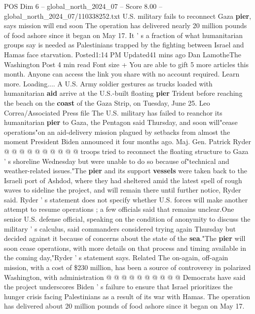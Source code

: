 \begin{textsample}{POS Dim 6 – global\_north\_2024\_07 – Score 8.00 – global\_north\_2024\_07/110338252.txt}  \label{ex:f6_pos_303}
U.S. military fails to reconnect Gaza \textbf{pier}, says mission will end soon The operation has delivered nearly 20 million pounds of food ashore since it began on May 17.
It ' s a fraction of what humanitarian groups say is needed as Palestinians trapped by the fighting between Israel and Hamas face starvation.
Posted1:14 PM Updated41 mins ago Dan LamotheThe Washington Post 4 min read Font size + You are able to gift 5 more articles this month.
Anyone can access the link you share with no account required.
Learn more.
Loading....
A U.S.
Army soldier gestures as trucks loaded with humanitarian \textbf{aid} arrive at the U.S.-built floating \textbf{pier} Trident before reaching the beach on the \textbf{coast} of the Gaza Strip, on Tuesday, June 25.
Leo Correa/Associated Press file The U.S. military has failed to reanchor its humanitarian \textbf{pier} to Gaza, the Pentagon said Thursday, and soon will"cease operations"on an aid-delivery mission plagued by setbacks from almost the moment President Biden announced it four months ago.
Maj.
Gen.
Patrick Ryder @ @ @ @ @ @ @ @ @ @ troops tried to reconnect the floating structure to Gaza ' s shoreline Wednesday but were unable to do so because of"technical and weather-related issues."The \textbf{pier} and its support \textbf{vessels} were taken back to the Israeli port of Ashdod, where they had sheltered amid the latest spell of rough waves to sideline the project, and will remain there until further notice, Ryder said.
Ryder ' s statement does not specify whether U.S. forces will make another attempt to resume operations ; a few officials said that remains unclear.One senior U.S. defense official, speaking on the condition of anonymity to discuss the military ' s calculus, said commanders considered trying again Thursday but decided against it because of concerns about the state of the \textbf{sea}."The \textbf{pier} will soon cease operations, with more details on that process and timing available in the coming day,"Ryder ' s statement says.
Related The on-again, off-again mission, with a cost of \$230 million, has been a source of controversy in polarized Washington, with administration @ @ @ @ @ @ @ @ @ @ Democrats have said the project underscores Biden ' s failure to ensure that Israel prioritizes the hunger crisis facing Palestinians as a result of its war with Hamas.
The operation has delivered about 20 million pounds of food ashore since it began on May 17.

\end{textsample}
